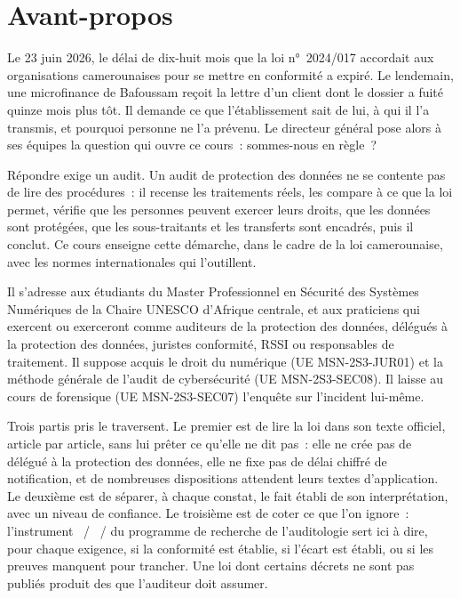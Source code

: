 
\chapter*{Avant-propos}

Le 23 juin 2026, le délai de dix-huit mois que la loi n°~2024/017 accordait
aux organisations camerounaises pour se mettre en conformité a expiré. Le
lendemain, une microfinance de Bafoussam reçoit la lettre d'un client dont
le dossier a fuité quinze mois plus tôt. Il demande ce que l'établissement
sait de lui, à qui il l'a transmis, et pourquoi personne ne l'a prévenu. Le
directeur général pose alors à ses équipes la question qui ouvre ce cours~:
sommes-nous en règle~?

Répondre exige un audit. Un audit de protection des données ne se contente
pas de lire des procédures~: il recense les traitements réels, les compare
à ce que la loi permet, vérifie que les personnes peuvent exercer leurs
droits, que les données sont protégées, que les sous-traitants et les
transferts sont encadrés, puis il conclut. Ce cours enseigne cette démarche,
dans le cadre de la loi camerounaise, avec les normes internationales qui
l'outillent.

Il s'adresse aux étudiants du Master Professionnel en Sécurité des Systèmes
Numériques de la Chaire UNESCO d'Afrique centrale, et aux praticiens qui
exercent ou exerceront comme auditeurs de la protection des données,
délégués à la protection des données, juristes conformité, RSSI ou
responsables de traitement. Il suppose acquis le droit du numérique (UE
MSN-2S3-JUR01) et la méthode générale de l'audit de cybersécurité (UE
MSN-2S3-SEC08). Il laisse au cours de forensique (UE MSN-2S3-SEC07)
l'enquête sur l'incident lui-même.

Trois partis pris le traversent. Le premier est de lire la loi dans son
texte officiel, article par article, sans lui prêter ce qu'elle ne dit pas~:
elle ne crée pas de délégué à la protection des données, elle ne fixe pas de
délai chiffré de notification, et de nombreuses dispositions attendent leurs
textes d'application. Le deuxième est de séparer, à chaque constat, le fait
établi de son interprétation, avec un niveau de confiance. Le troisième est
de coter ce que l'on ignore~: l'instrument \OUI{}~/ \NON{}~/ \NEK{} du
programme de recherche de l'auditologie sert ici à dire, pour chaque
exigence, si la conformité est établie, si l'écart est établi, ou si les
preuves manquent pour trancher. Une loi dont certains décrets ne sont pas
publiés produit des \NEK{} que l'auditeur doit assumer.

